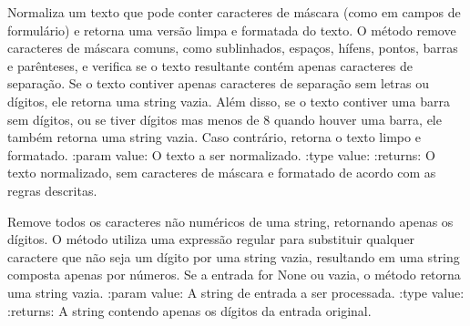 \documentclass[letterpaper,10pt,english]{sphinxmanual}
\begin{document}
\begin{fulllineitems}
\label{\detokenize{api/formatters:formatters.normalize_masked_text}}
\pysigstartsignatures
\pysiglinewithargsret
{}
{}
{}
\pysigstopsignatures
\sphinxAtStartPar
Normaliza um texto que pode conter caracteres de máscara (como em campos de formulário) e retorna uma versão limpa e formatada do texto. O método remove caracteres de máscara comuns, como sublinhados, espaços, hífens, pontos, barras e parênteses, e verifica se o texto resultante contém apenas caracteres de separação. Se o texto contiver apenas caracteres de separação sem letras ou dígitos, ele retorna uma string vazia. Além disso, se o texto contiver uma barra sem dígitos, ou se tiver dígitos mas menos de 8 quando houver uma barra, ele também retorna uma string vazia. Caso contrário, retorna o texto limpo e formatado.
:param value: O texto a ser normalizado.
:type value: 
:returns: O texto normalizado, sem caracteres de máscara e formatado de acordo com as regras descritas.
\begin{quote}\begin{description}
\sphinxAtStartPar
{}

\end{description}\end{quote}

\end{fulllineitems}


\begin{fulllineitems}
\label{\detokenize{api/formatters:formatters.digits_only}}
\pysigstartsignatures
\pysiglinewithargsret
{}
{}
{}
\pysigstopsignatures
\sphinxAtStartPar
Remove todos os caracteres não numéricos de uma string, retornando apenas os dígitos. O método utiliza uma expressão regular para substituir qualquer caractere que não seja um dígito por uma string vazia, resultando em uma string composta apenas por números. Se a entrada for None ou vazia, o método retorna uma string vazia.
:param value: A string de entrada a ser processada.
:type value: 
:returns: A string contendo apenas os dígitos da entrada original.
\begin{quote}\begin{description}
\sphinxAtStartPar
{}

\end{description}\end{quote}

\end{fulllineitems}
\end{document}
